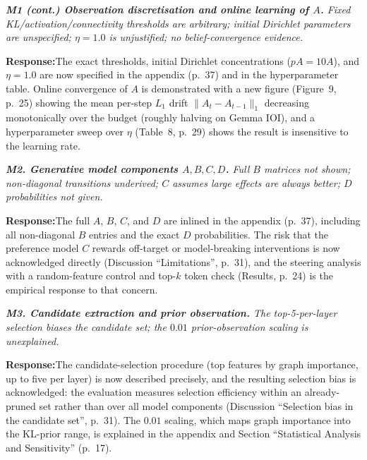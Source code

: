\documentclass[11pt]{article}
\newenvironment{comment}{%
  \def\FrameCommand{{\color{commentrule}\vrule width 3pt}\hspace{0pt}%
    \fboxsep=8pt\colorbox{commentbg}}%
  \MakeFramed{\advance\hsize-\width\FrameRestore}%
  \itshape\small}{\endMakeFramed}
\newcommand{\response}{\par\smallskip\noindent\textbf{Response:}\;}
\begin{document}
\begin{comment}
\textbf{M1 (cont.) Observation discretisation and online learning of $A$.} Fixed
KL/activation/connectivity thresholds are arbitrary; initial Dirichlet parameters
are unspecified; $\eta=1.0$ is unjustified; no belief-convergence evidence.
\end{comment}
\response The exact thresholds, initial Dirichlet concentrations ($pA=10A$), and
$\eta=1.0$ are now specified in the appendix (p.~37) and in the hyperparameter
table. Online convergence of $A$ is demonstrated with a new figure (Figure~9,
p.~25) showing the mean per-step $L_1$ drift $\|A_t-A_{t-1}\|_1$ decreasing
monotonically over the budget (roughly halving on Gemma IOI), and a hyperparameter
sweep over $\eta$ (Table~8, p.~29) shows the result is insensitive to the learning
rate.

\begin{comment}
\textbf{M2. Generative model components $A,B,C,D$.} Full $B$ matrices not shown;
non-diagonal transitions underived; $C$ assumes large effects are always better;
$D$ probabilities not given.
\end{comment}
\response The full $A$, $B$, $C$, and $D$ are inlined in the appendix (p.~37),
including all non-diagonal $B$ entries and the exact $D$ probabilities. The risk
that the preference model $C$ rewards off-target or model-breaking interventions
is now acknowledged directly (Discussion ``Limitations'', p.~31), and the
steering analysis with a random-feature control and top-$k$ token check
(Results, p.~24) is the empirical response to that concern.

\begin{comment}
\textbf{M3. Candidate extraction and prior observation.} The top-5-per-layer
selection biases the candidate set; the $0.01$ prior-observation scaling is
unexplained.
\end{comment}
\response The candidate-selection procedure (top features by graph importance,
up to five per layer) is now described precisely, and the resulting selection bias
is acknowledged: the evaluation measures selection efficiency within an
already-pruned set rather than over all model components (Discussion ``Selection
bias in the candidate set'', p.~31). The $0.01$ scaling, which maps graph
importance into the KL-prior range, is explained in the appendix and Section
``Statistical Analysis and Sensitivity'' (p.~17).
\end{document}
